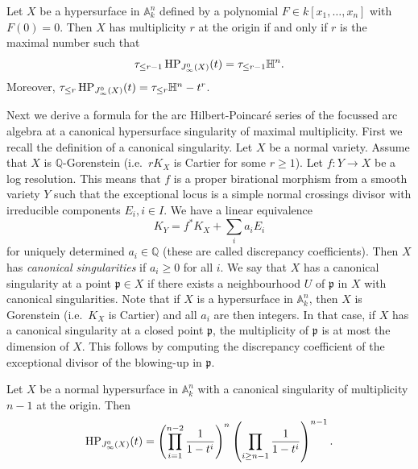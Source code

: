 \begin{Prop}\label{prop:multiplicity_from_HPseries}
Let $X$ be a hypersurface in $\mathbb{A}^n_k$ defined by a polynomial $F\in k[x_1,\ldots,x_n]$ with $F(0)=0$. Then $X$ has multiplicity $r$ at the origin if and only if $r$ is the maximal number such that
\[  \tau_{\leq r-1} \operatorname{HP}_{J_{\infty}^{0}(X)}(t) = \tau_{\leq r-1} \mathbb{H}^n. \]
Moreover, $\tau_{\leq r} \operatorname{HP}_{J_{\infty}^{0}(X)}(t) = \tau_{\leq r} \mathbb{H}^n - t^r$.
\end{Prop}

Next we derive a formula for the arc Hilbert-Poincar\'{e} series of the focussed arc algebra at a canonical hypersurface singularity of maximal multiplicity. First we recall the definition of a canonical singularity. Let $X$ be a normal variety. Assume that $X$ is $\mathbb{Q}$-Gorenstein (i.e.\ $rK_X$ is Cartier for some $r\geq 1$). Let $f: Y\to X$ be a log resolution. This means that $f$ is a proper birational morphism from a smooth variety $Y$ such that the exceptional locus is a simple normal crossings divisor with irreducible components $E_i, i\in I$. We have a linear equivalence
\[  K_Y = f^*K_X + \sum_i a_i E_i \] 
for uniquely determined $a_i\in \mathbb{Q}$ (these are called discrepancy coefficients). Then $X$ has \textit{canonical singularities} if $a_i \geq 0$ for all $i$. We say that $X$ has a canonical singularity at a point $\mathfrak{p}\in X$ if there exists a neighbourhood $U$ of $\mathfrak{p}$ in $X$ with canonical singularities. Note that if $X$ is a hypersurface in $\mathbb{A}^n_k$, then $X$ is Gorenstein (i.e.\ $K_X$ is Cartier) and all $a_i$ are then integers. In that case, if $X$ has a canonical singularity at a closed point $\mathfrak{p}$, the multiplicity of $\mathfrak{p}$ is at most the dimension of $X$. This follows by computing the discrepancy coefficient of the exceptional divisor of the blowing-up in $\mathfrak{p}$. 

\begin{Prop}\label{prop:canonical_sing}
Let $X$ be a normal hypersurface in $\mathbb{A}^n_k$ with a canonical singularity of multiplicity $n-1$ at the origin. Then 
\[ \operatorname{HP}_{J_{\infty}^{0}(X)}(t) = \left(\prod_{i=1}^{n-2} \frac{1}{1-t^i}\right)^{n} \left(\prod_{i\geq n-1} \frac{1}{1-t^i}\right)^{n-1} .\]
\end{Prop}


